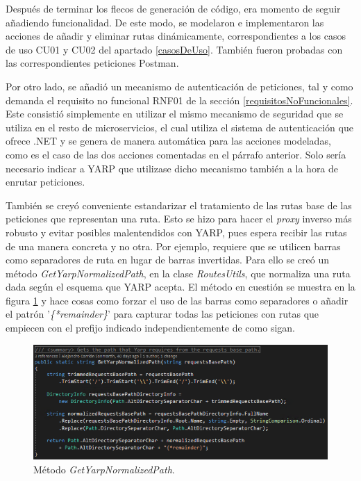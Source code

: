 \documentclass[11pt,spanish,listoffigures]{tfgetsinf}
\begin{document}
Después de terminar los flecos de generación de código, era momento de seguir añadiendo funcionalidad. De este modo, se modelaron e implementaron las acciones de añadir y eliminar rutas dinámicamente, correspondientes a los casos de uso CU01 y CU02 del apartado \ref{casosDeUso}. También fueron probadas con las correspondientes peticiones Postman.

Por otro lado, se añadió un mecanismo de autenticación de peticiones, tal y como demanda el requisito no funcional RNF01 de la sección \ref{requisitosNoFuncionales}. Este consistió simplemente en utilizar el mismo mecanismo de seguridad que se utiliza en el resto de microservicios, el cual utiliza el sistema de autenticación que ofrece .NET y se genera de manera automática para las acciones modeladas, como es el caso de las dos acciones comentadas en el párrafo anterior. Solo sería necesario indicar a YARP que utilizase dicho mecanismo también a la hora de enrutar peticiones.

También se creyó conveniente estandarizar el tratamiento de las rutas base de las peticiones que representan una ruta. Esto se hizo para hacer el \emph{proxy} inverso más robusto y evitar posibles malentendidos con YARP, pues espera recibir las rutas de una manera concreta y no otra. Por ejemplo, requiere que se utilicen barras como separadores de ruta en lugar de barras invertidas. Para ello se creó un método \emph{GetYarpNormalizedPath}, en la clase \emph{RoutesUtils}, que normaliza una ruta dada según el esquema que YARP acepta. El método en cuestión se muestra en la figura \ref{getYarpNormalizedPath} y hace cosas como forzar el uso de las barras como separadores o añadir el patrón '\emph{\{*remainder\}}' para capturar todas las peticiones con rutas que empiecen con el prefijo indicado independientemente de como sigan.

\begin{figure}[ht]
\centering
\includegraphics[width=1\textwidth]{imagenes/getYarpNormalizedPath}
\caption{Método \emph{GetYarpNormalizedPath}.}
	\label{getYarpNormalizedPath}
\end{figure}
\end{document}
